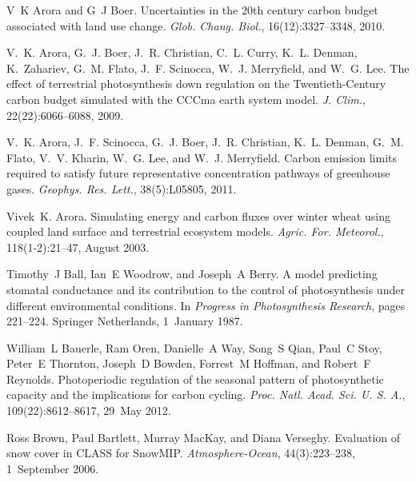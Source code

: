 \begin{DoxyDescription}
\item[\label{_CITEREF_Arora2010-416}%
\mbox{[}9\mbox{]}]V~K Arora and G~J Boer. Uncertainties in the 20th century carbon budget associated with land use change. {\itshape Glob. Chang. Biol.}, 16(12)\+:3327--3348, 2010. 


\item[\label{_CITEREF_Arora2009-9bc}%
\mbox{[}10\mbox{]}]V.~K. Arora, G.~J. Boer, J.~R. Christian, C.~L. Curry, K.~L. Denman, K.~Zahariev, G.~M. Flato, J.~F. Scinocca, W.~J. Merryfield, and W.~G. Lee. The effect of terrestrial photosynthesis down regulation on the Twentieth-\/\+Century carbon budget simulated with the C\+C\+Cma earth system model. {\itshape J. Clim.}, 22(22)\+:6066--6088, 2009. 


\item[\label{_CITEREF_Arora2011-79f}%
\mbox{[}11\mbox{]}]V.~K. Arora, J.~F. Scinocca, G.~J. Boer, J.~R. Christian, K.~L. Denman, G.~M. Flato, V.~V. Kharin, W.~G. Lee, and W.~J. Merryfield. Carbon emission limits required to satisfy future representative concentration pathways of greenhouse gases. {\itshape Geophys. Res. Lett.}, 38(5)\+:L05805, 2011. 


\item[\label{_CITEREF_Arora2003-3b7}%
\mbox{[}12\mbox{]}]Vivek~K. Arora. Simulating energy and carbon fluxes over winter wheat using coupled land surface and terrestrial ecosystem models. {\itshape Agric. For. Meteorol.}, 118(1-\/2)\+:21--47, August 2003. 


\item[\label{_CITEREF_Ball1987-ou}%
\mbox{[}13\mbox{]}]Timothy~J Ball, Ian~E Woodrow, and Joseph~A Berry. A model predicting stomatal conductance and its contribution to the control of photosynthesis under different environmental conditions. In {\itshape Progress in Photosynthesis Research}, pages 221--224. Springer Netherlands, 1~January 1987. 


\item[\label{_CITEREF_Bauerle2012-c29}%
\mbox{[}14\mbox{]}]William~L Bauerle, Ram Oren, Danielle~A Way, Song~S Qian, Paul~C Stoy, Peter~E Thornton, Joseph~D Bowden, Forrest~M Hoffman, and Robert~F Reynolds. Photoperiodic regulation of the seasonal pattern of photosynthetic capacity and the implications for carbon cycling. {\itshape Proc. Natl. Acad. Sci. U. S. A.}, 109(22)\+:8612--8617, 29~May 2012. 


\item[\label{_CITEREF_Brown2006-ec}%
\mbox{[}15\mbox{]}]Ross Brown, Paul Bartlett, Murray Mac\+Kay, and Diana Verseghy. Evaluation of snow cover in C\+L\+A\+S\+S for Snow\+M\+I\+P. {\itshape Atmosphere-\/\+Ocean}, 44(3)\+:223--238, 1~September 2006. 



\end{DoxyDescription}
